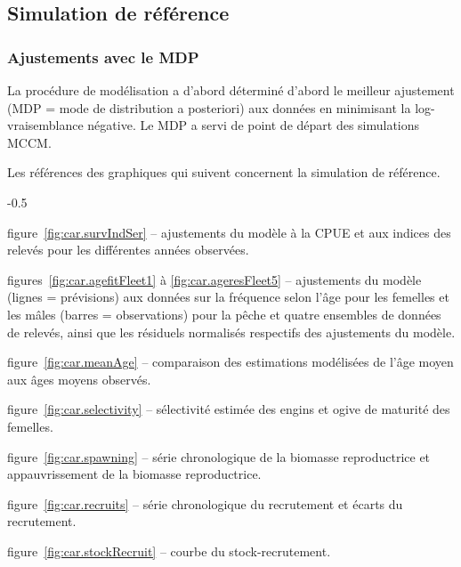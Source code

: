 \documentclass[11pt]{book}
\begin{document}
\subsection{Simulation de r\'{e}f\'{e}rence}
\subsubsection{Ajustements avec le MDP}\label{sssMPD}


La proc\'{e}dure de mod\'{e}lisation a d'abord d\'{e}termin\'{e} d'abord le meilleur ajustement (MDP = mode de distribution a posteriori) aux donn\'{e}es en minimisant la log-vraisemblance n\'{e}gative. Le MDP a servi de point de d\'{e}part des simulations MCCM.

Les r\'{e}f\'{e}rences des graphiques qui suivent concernent la simulation de r\'{e}f\'{e}rence.
\begin{itemize_csas}{-0.5}{}
  \item figure~\ref{fig:car.survIndSer} -- ajustements du mod\`{e}le \`{a} la CPUE et aux indices des relev\'{e}s pour les diff\'{e}rentes ann\'{e}es observ\'{e}es.
  \item figures~\ref{fig:car.agefitFleet1} \`{a} \ref{fig:car.ageresFleet5} -- ajustements du mod\`{e}le (lignes = pr\'{e}visions) aux donn\'{e}es sur la fr\'{e}quence selon l'\^{a}ge pour les femelles et les m\^{a}les (barres = observations) pour la p\^{e}che et quatre ensembles de donn\'{e}es de relev\'{e}s, ainsi que les r\'{e}siduels normalis\'{e}s respectifs des ajustements du mod\`{e}le.
  \item figure~\ref{fig:car.meanAge} -- comparaison des estimations mod\'{e}lis\'{e}es de l'\^{a}ge moyen aux \^{a}ges moyens observ\'{e}s.
  \item figure~\ref{fig:car.selectivity} -- s\'{e}lectivit\'{e} estim\'{e}e des engins et ogive de maturit\'{e} des femelles.
  \item figure~\ref{fig:car.spawning} -- s\'{e}rie chronologique de la biomasse reproductrice et appauvrissement de la biomasse reproductrice.
  \item figure~\ref{fig:car.recruits} -- s\'{e}rie chronologique du recrutement et \'{e}carts du recrutement.
  \item figure~\ref{fig:car.stockRecruit} -- courbe du stock-recrutement.
\end{itemize_csas}
\end{document}
